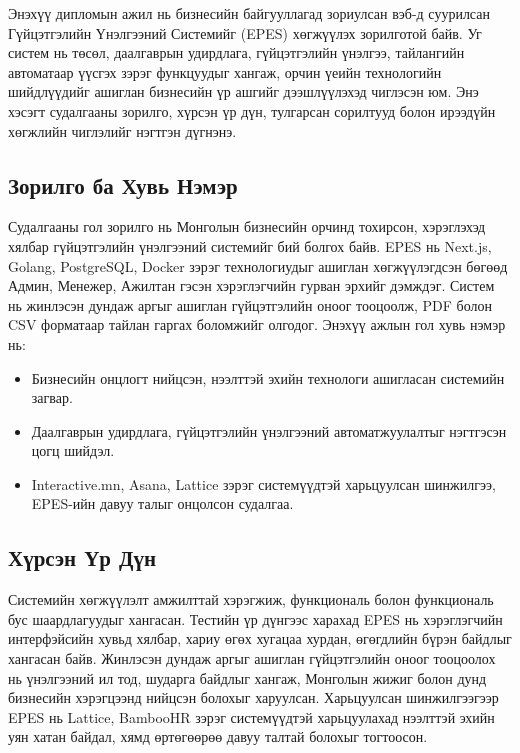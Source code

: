 Энэхүү дипломын ажил нь бизнесийн байгууллагад зориулсан вэб-д суурилсан Гүйцэтгэлийн Үнэлгээний Системийг (EPES) хөгжүүлэх зорилготой байв. 
Уг систем нь төсөл, даалгаврын удирдлага, гүйцэтгэлийн үнэлгээ, тайлангийн автоматаар үүсгэх зэрэг функцуудыг хангаж, орчин үеийн технологийн шийдлүүдийг ашиглан бизнесийн 
үр ашгийг дээшлүүлэхэд чиглэсэн юм. Энэ хэсэгт судалгааны зорилго, хүрсэн үр дүн, тулгарсан сорилтууд болон ирээдүйн хөгжлийн чиглэлийг нэгтгэн дүгнэнэ.

\subsection{Зорилго ба Хувь Нэмэр}
Судалгааны гол зорилго нь Монголын бизнесийн орчинд тохирсон, хэрэглэхэд хялбар гүйцэтгэлийн үнэлгээний системийг 
бий болгох байв. EPES нь Next.js, Golang, PostgreSQL, Docker зэрэг технологиудыг ашиглан хөгжүүлэгдсэн бөгөөд Админ, Менежер, 
Ажилтан гэсэн хэрэглэгчийн гурван эрхийг дэмждэг. Систем нь жинлэсэн дундаж аргыг ашиглан гүйцэтгэлийн оноог тооцоолж, PDF болон 
CSV форматаар тайлан гаргах боломжийг олгодог. Энэхүү ажлын гол хувь нэмэр нь:
\begin{itemize}
    \item Бизнесийн онцлогт нийцсэн, нээлттэй эхийн технологи ашигласан системийн загвар.
    \item Даалгаврын удирдлага, гүйцэтгэлийн үнэлгээний автоматжуулалтыг нэгтгэсэн цогц шийдэл.
    \item Interactive.mn, Asana, Lattice зэрэг системүүдтэй харьцуулсан шинжилгээ, EPES-ийн давуу талыг онцолсон судалгаа.
\end{itemize}

\subsection{Хүрсэн Үр Дүн}
Системийн хөгжүүлэлт амжилттай хэрэгжиж, функциональ болон функциональ бус шаардлагуудыг хангасан. Тестийн үр дүнгээс харахад EPES нь хэрэглэгчийн 
интерфэйсийн хувьд хялбар, хариу өгөх хугацаа хурдан, өгөгдлийн бүрэн байдлыг хангасан байв. Жинлэсэн дундаж аргыг ашиглан гүйцэтгэлийн оноог 
тооцоолох нь үнэлгээний ил тод, шударга байдлыг хангаж, Монголын жижиг болон дунд бизнесийн хэрэгцээнд нийцсэн болохыг харуулсан. Харьцуулсан 
шинжилгээгээр EPES нь Lattice, BambooHR зэрэг системүүдтэй харьцуулахад нээлттэй эхийн уян хатан байдал, хямд өртөгөөрөө давуу талтай болохыг 
тогтоосон.

